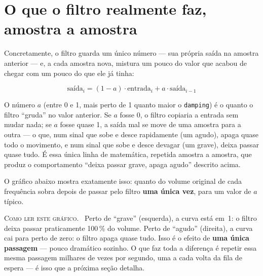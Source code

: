 \documentclass[11pt,oneside]{book}
\newcommand{\nova}[1]{\textsc{\color{accent}#1.}~}
\begin{document}
\section*{O que o filtro realmente faz, amostra a amostra}

Concretamente, o filtro guarda um único número --- sua própria saída na
amostra anterior --- e, a cada amostra nova, mistura um pouco do valor que
acabou de chegar com um pouco do que ele já tinha:

\[
\text{saída}_i = (1 - a)\cdot\text{entrada}_i + a\cdot\text{saída}_{i-1}
\]

O número $a$ (entre 0 e 1, mais perto de 1 quanto maior o
\texttt{damping}) é o quanto o filtro \enquote{gruda} no valor anterior.
Se $a$ fosse 0, o filtro copiaria a entrada sem mudar nada; se $a$ fosse
quase 1, a saída mal se move de uma amostra para a outra --- o que, num
sinal que sobe e desce rapidamente (um agudo), apaga quase todo o
movimento, e num sinal que sobe e desce devagar (um grave), deixa passar
quase tudo. É essa única linha de matemática, repetida amostra a amostra,
que produz o comportamento \enquote{deixa passar grave, apaga agudo}
descrito acima.

O gráfico abaixo mostra exatamente isso: quanto do volume original de cada
frequência sobra depois de passar pelo filtro \textbf{uma única vez}, para
um valor de $a$ típico.

\begin{center}
\end{center}

\begin{newword}
\nova{Como ler este gráfico} Perto de \enquote{grave} (esquerda), a curva
está em~1: o filtro deixa passar praticamente 100\,\% do volume. Perto de
\enquote{agudo} (direita), a curva cai para perto de zero: o filtro apaga
quase tudo. Isso é o efeito de \textbf{uma única passagem} --- pouco
dramático sozinho. O que faz toda a diferença é repetir essa mesma
passagem milhares de vezes por segundo, uma a cada volta da fila de
espera --- é isso que a próxima seção detalha.
\end{newword}
\end{document}
